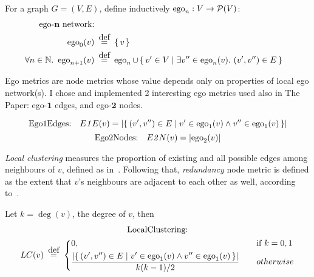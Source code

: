 For a graph $G = (V, E)$, define inductively $\operatorname{ego}_n : V \rightarrow \mathcal{P}(V)$:
\begin{align}
    \text{ego-$\mathbf{n}$ network:} \nonumber \\
    \ego_0(v) &\eqdef \left\{\, v \, \right\} \\
    \forall n \in \mathbb{N}.\ \ego_{n+1} (v) &\eqdef \ego_n \cup \Set{v' \in V}{ \exists v'' \in \ego_n(v).\ (v', v'') \in E }
\end{align}

Ego metrics are node metrics whose value depends only on properties of local ego network(s).
I chose and implemented 2 interesting ego metrics used also in The Paper: ego-$\mathbf{1}$ edges, and ego-$\mathbf{2}$ nodes.

\begin{equation}
    \text{Ego1Edges:}\quad E\mathit{1}E (v) = \left\lvert \left\{\, (v', v'') \in E \mid  v' \in \operatorname{ego}_1(v) \wedge v'' \in \operatorname{ego}_1(v)  \, \right\} \right\rvert
\end{equation}
\begin{equation}
    \text{Ego2Nodes:}\quad E\mathit{2}N (v) = \left\lvert \operatorname{ego}_2(v) \right\rvert
\end{equation}

\textsl{Local clustering} measures the proportion of existing and all possible edges among neighbours of $v$, defined as in~\cite{WattsCollectiveDynamicsSmallworld1998}.
Following that, \textsl{redundancy} node metric is defined as the extent that $v$'s neighbours are adjacent to each other as well, according to~\cite{borgatti1997structural}.

Let $k = \deg(v)$, the degree of $v$, then
\begin{multline}
    \text{LocalClustering:}\nonumber \\
    LC(v) \eqdef
    \begin{dcases}
        0, &\text{if } k = 0,1 \\
        \frac{ \left\lvert \Set{ (v', v'') \in E }{ v' \in \ego_1(v) \wedge v'' \in \ego_1(v) } \right\rvert }{ k (k-1) / 2 } \quad &otherwise
    \end{dcases}
\end{multline}

